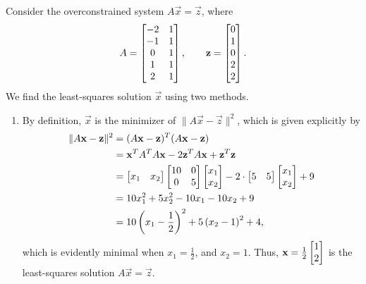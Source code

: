 \documentclass{homework}
\begin{document}
	\question Consider the overconstrained system $A\vec{x} = \vec{z}$, where
	\begin{equation*}
		A = \left[\begin{matrix}-2 & 1 \\ -1 & 1 \\ 0 & 1 \\ 1 & 1 \\ 2 & 1\end{matrix}\right], \qquad \mathbf{z} = \left[\begin{matrix}0 \\ 1 \\ 0 \\ 2 \\ 2\end{matrix}\right].
	\end{equation*}
	We find the least-squares solution $\vec{x}$ using two methods.
	\begin{enumerate}
		\item By definition, $\vec{x}$ is the minimizer of $\lVert A\vec{x} - \vec{z}\rVert^2$, which is given explicitly by
		\begin{equation*}
		\begin{aligned}
			\lVert A\mathbf{x} - \mathbf{z}\rVert^2 &= (A\mathbf{x} - \mathbf{z})^T(A\mathbf{x} -\mathbf{z}) \\
			&= \mathbf{x}^TA^TA\mathbf{x} -2\mathbf{z}^TA\mathbf{x} + \mathbf{z}^T\mathbf{z} \\
			&= \left[\begin{matrix}x_1&x_2\end{matrix}\right]\left[\begin{matrix}10 & 0\\0 & 5\end{matrix}\right]\left[\begin{matrix}x_1 \\x_2\end{matrix}\right] -2\cdot\left[\begin{matrix}5&5\end{matrix}\right]\left[\begin{matrix}x_1\\x_2\end{matrix}\right] + 9\\
			&= 10x_1^2 + 5x_2^2 - 10x_1 - 10x_2 + 9 \\
			&= 10\left(x_1-\frac{1}{2}\right)^2 + 5\left(x_2-1\right)^2 +4,
		\end{aligned}
		\end{equation*}
		which is evidently minimal when $x_1 = \frac{1}{2}$, and $x_2 = 1$. Thus, $\mathbf{x} = \frac{1}{2}\left[\begin{matrix}1\\2\end{matrix}\right]$ is the least-squares solution $A\vec{x} = \vec{z}$.
		

\end{enumerate}
\end{document}
